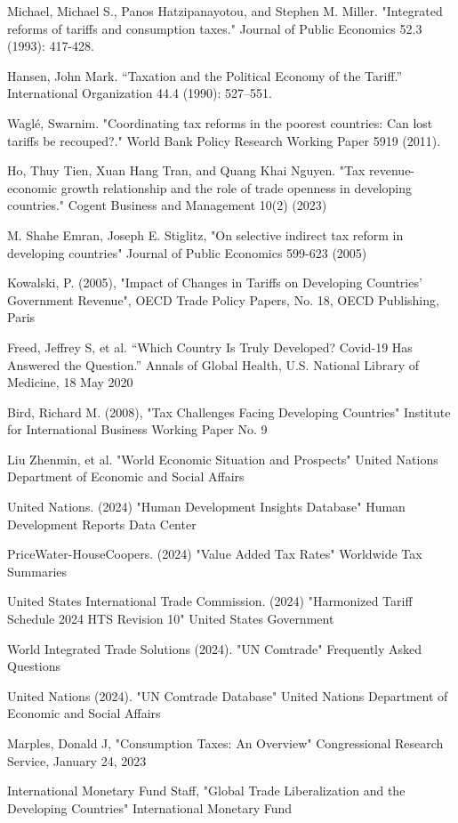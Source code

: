 \documentclass[12pt]{article}
\begin{document}
Michael, Michael S., Panos Hatzipanayotou, and Stephen M. Miller. "Integrated reforms of tariffs and consumption taxes." Journal of Public Economics 52.3 (1993): 417-428.

Hansen, John Mark. “Taxation and the Political Economy of the Tariff.” International Organization 44.4 (1990): 527–551.

Waglé, Swarnim. "Coordinating tax reforms in the poorest countries: Can lost tariffs be recouped?." World Bank Policy Research Working Paper 5919 (2011).

Ho, Thuy Tien, Xuan Hang Tran, and Quang Khai Nguyen. "Tax revenue-economic growth relationship and the role of trade openness in developing countries." Cogent Business and Management 10(2) (2023)

M. Shahe Emran, Joseph E. Stiglitz, "On selective indirect tax reform in developing countries" Journal of Public Economics 599-623 (2005)

Kowalski, P. (2005), "Impact of Changes in Tariffs on Developing Countries' Government Revenue", OECD Trade Policy Papers, No. 18, OECD Publishing, Paris

Freed, Jeffrey S, et al. “Which Country Is Truly Developed? Covid-19 Has Answered the Question.” Annals of Global Health, U.S. National Library of Medicine, 18 May 2020

Bird, Richard M. (2008), "Tax Challenges Facing Developing Countries" Institute for International Business Working Paper No. 9

Liu Zhenmin, et al. "World Economic Situation and Prospects" United Nations Department of Economic and Social Affairs

United Nations. (2024) "Human Development Insights Database" Human Development Reports Data Center

PriceWater-HouseCoopers. (2024) "Value Added Tax Rates" Worldwide Tax Summaries 

United States International Trade Commission. (2024) "Harmonized Tariff Schedule 2024 HTS Revision 10" United States Government

World Integrated Trade Solutions (2024). "UN Comtrade" Frequently Asked Questions

United Nations (2024). "UN Comtrade Database" United Nations Department of Economic and Social Affairs

Marples, Donald J, "Consumption Taxes: An Overview" Congressional Research Service, January 24, 2023

International Monetary Fund Staff, "Global Trade Liberalization and the Developing Countries" International Monetary Fund
\end{document}
